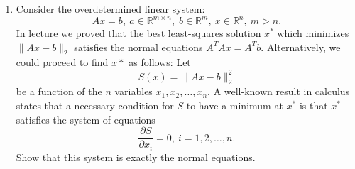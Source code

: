 \documentclass{article}
\newcommand{\twonorm}[1]{\| #1 \|_2}
\newcommand{\rdim}[2]{\mathbb{R}^{#1 \times #2}}
\begin{document}
\thispagestyle{fancy}
\begin{enumerate}
  \item Consider the overdetermined linear system:
  \[ Ax = b,\: a \in \rdim{m}{n}, \; b \in \mathbb{R}^m,\: x \in \mathbb{R}^n, \: m > n.\]
  In lecture we proved that the best least-squares solution $x^*$ which minimizes $\twonorm{Ax-b}$ satisfies the normal equations $A^TAx=A^Tb$. Alternatively, we could proceed to find $x*$ as follows: Let
  \[ S(x) = \twonorm{Ax - b}^2 \]
  be a function of the $n$ variables $x_1,x_2,\dots,x_n$. A well-known result in calculus states that a necessary condition for $S$ to have a minimum at $x^*$ is that $x^*$ satisfies the system of equations
  \[ \frac{\partial S}{\partial x_i} = 0, \: i = 1,2,\dots,n.\]
  Show that this system is exactly the normal equations.
  

\end{enumerate}
\end{document}
